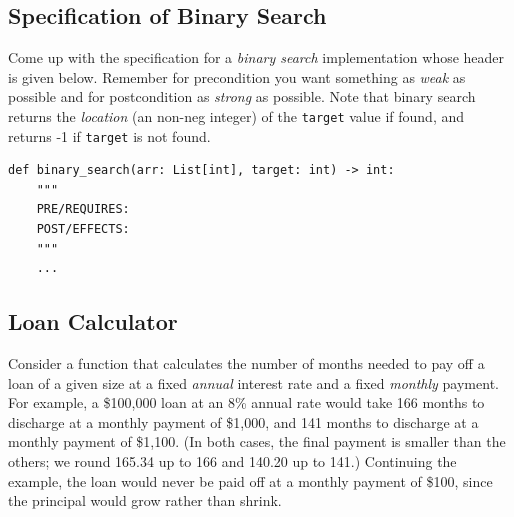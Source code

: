 \documentclass[oneside,11pt,dvipsnames]{book}
\newcommand{\code}[1]{\texttt{#1}}
\begin{document}
\subsection{Specification of Binary Search}\label{exercise:specs-binary-search}

Come up with the specification for a \emph{binary search} implementation whose header is given below. Remember for precondition you want something as \emph{weak} as possible and for postcondition as \emph{strong} as possible. Note that binary search returns the \emph{location} (an non-neg integer) of the \code{target} value if found, and returns -1 if \code{target} is not found. 

\begin{lstlisting}
def binary_search(arr: List[int], target: int) -> int:
    """
    PRE/REQUIRES: 
    POST/EFFECTS: 
    """
    ... 
\end{lstlisting}


\subsection{Loan Calculator}\label{exercise:loan-calculator}    

Consider a function that calculates the number of months needed to pay off a loan of a given size at a fixed \emph{annual} interest rate and a fixed \emph{monthly} payment. For example, a \$100,000 loan at an 8\% annual rate would take 166 months to discharge at a monthly payment of \$1,000, and 141 months to discharge at a monthly payment of \$1,100. (In both cases, the final payment is smaller than the others; we round 165.34 up to 166 and 140.20 up to 141.) Continuing the example, the loan would never be paid off at a monthly payment of \$100, since the principal would grow rather than shrink.
\end{document}
